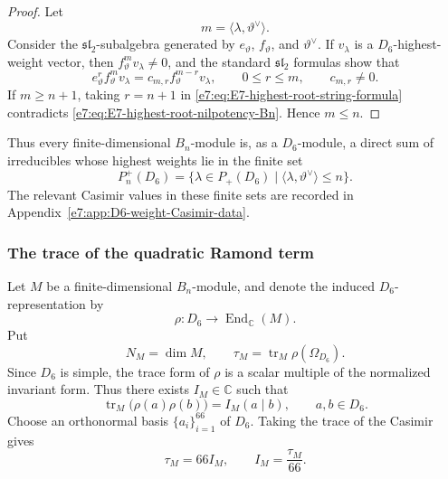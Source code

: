 \documentclass[11pt,reqno]{amsart}
\theoremstyle{definition}
\theoremstyle{remark}
\begin{document}
\begin{proof}
Let
\[
  m=\langle\lambda,\vartheta^\vee\rangle.
\]
Consider the $\mathfrak{sl}_2$-subalgebra generated by
$e_\vartheta$, $f_\vartheta$, and $\vartheta^\vee$.  If $v_\lambda$ is a
$D_6$-highest-weight vector, then
$f_\vartheta^m v_\lambda\ne0$, and the standard $\mathfrak{sl}_2$ formulas
show that
\begin{equation}
  e_\vartheta^r f_\vartheta^m v_\lambda
  =c_{m,r}f_\vartheta^{m-r}v_\lambda,
  \qquad
  0\le r\le m,
  \qquad
  c_{m,r}\ne0.
  \label{e7:eq:E7-highest-root-string-formula}
\end{equation}
If $m\ge n+1$, taking $r=n+1$ in
\eqref{e7:eq:E7-highest-root-string-formula} contradicts
\eqref{e7:eq:E7-highest-root-nilpotency-Bn}.  Hence $m\le n$.
\end{proof}

Thus every finite-dimensional $B_n$-module is, as a $D_6$-module, a direct
sum of irreducibles whose highest weights lie in the finite set
\begin{equation*}
  P_n^+(D_6)
  =
  \{\lambda\in P_+(D_6)
    \mid
    \langle\lambda,\vartheta^\vee\rangle\le n\}.
\end{equation*}
The relevant Casimir values in these finite sets are recorded in
Appendix~\ref{e7:app:D6-weight-Casimir-data}.

\subsubsection{The trace of the quadratic Ramond term}


Let $M$ be a finite-dimensional $B_n$-module, and denote the induced
$D_6$-representation by
\begin{equation*}
  \rho:D_6\longrightarrow\operatorname{End}_{\mathbb C}(M).
\end{equation*}
Put
\begin{equation*}
  N_M=\dim M,
  \qquad
  \tau_M=\operatorname{tr}_M\rho(\Omega_{D_6}).
\end{equation*}
Since $D_6$ is simple, the trace form of $\rho$ is a scalar multiple of the
normalized invariant form.  Thus there exists $I_M\in\mathbb C$ such that
\begin{equation}
  \operatorname{tr}_M\bigl(\rho(a)\rho(b)\bigr)
  =I_M(a\mid b),
  \qquad a,b\in D_6.
  \label{e7:eq:E7-Dynkin-index-definition}
\end{equation}
Choose an orthonormal basis
$\{a_i\}_{i=1}^{66}$ of $D_6$.  Taking the trace of the Casimir gives
\begin{equation}
  \tau_M=66I_M,
  \qquad
  I_M=\frac{\tau_M}{66}.
  \label{e7:eq:E7-Dynkin-index-Casimir-trace}
\end{equation}
\end{document}
